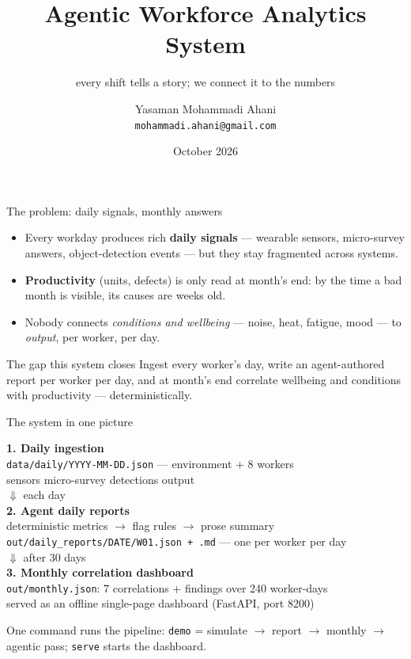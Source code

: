 \documentclass[aspectratio=169]{beamer}
\title{Agentic Workforce Analytics System}
\subtitle{every shift tells a story; we connect it to the numbers}
\author{Yasaman Mohammadi Ahani \\ \texttt{mohammadi.ahani@gmail.com}}
\date{October 2026}
\begin{document}
\begin{frame}
  \titlepage
\end{frame}

\begin{frame}{The problem: daily signals, monthly answers}
  \begin{itemize}
    \item Every workday produces rich \textbf{daily signals} --- wearable
          sensors, micro-survey answers, object-detection events --- but they
          stay fragmented across systems.
    \item \textbf{Productivity} (units, defects) is only read at month's end:
          by the time a bad month is visible, its causes are weeks old.
    \item Nobody connects \emph{conditions and wellbeing} --- noise, heat,
          fatigue, mood --- to \emph{output}, per worker, per day.
  \end{itemize}
  \begin{block}{The gap this system closes}
    Ingest every worker's day, write an agent-authored report per worker per
    day, and at month's end correlate wellbeing and conditions with
    productivity --- deterministically.
  \end{block}
\end{frame}

\begin{frame}{The system in one picture}
  \begin{center}
    \textbf{1. Daily ingestion}\\[2pt]
    \texttt{data/daily/YYYY-MM-DD.json} --- environment + 8 workers\\
    sensors \textbullet{} micro-survey \textbullet{} detections \textbullet{} output\\[6pt]
    $\Downarrow$ \quad each day\\[4pt]
    \textbf{2. Agent daily reports}\\[2pt]
    deterministic metrics $\rightarrow$ flag rules $\rightarrow$ prose summary\\
    \texttt{out/daily\_reports/DATE/W01.json + .md} --- one per worker per day\\[6pt]
    $\Downarrow$ \quad after 30 days\\[4pt]
    \textbf{3. Monthly correlation dashboard}\\[2pt]
    \texttt{out/monthly.json}: 7 correlations + findings over 240 worker-days\\
    served as an offline single-page dashboard (FastAPI, port 8200)
  \end{center}
  One command runs the pipeline: \texttt{demo} = simulate $\rightarrow$ report
  $\rightarrow$ monthly $\rightarrow$ agentic pass; \texttt{serve} starts the
  dashboard.
\end{frame}
\end{document}
